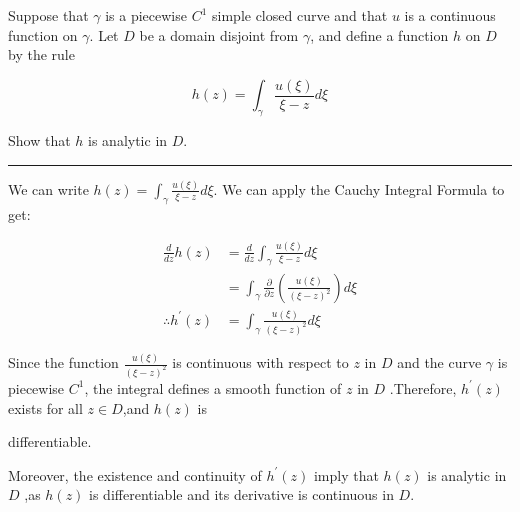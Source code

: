 \begin{example}

    Suppose that $\gamma$ is a piecewise $C^{1}$ simple closed curve and that $u$ is a continuous function on $\gamma$. Let $D$ be a domain disjoint from $\gamma$,
    and define a function $h$ on $D$ by the rule

    $$h(z)=\int_\gamma\frac{u(\xi)}{\xi-z}d\xi $$

    Show that $h$ is analytic in $D.$ \\

    \hrule
    \vspace{0.5cm}

    We can write $h(z) = \int_\gamma\frac{u(\xi)}{\xi-z}d\xi$. We can apply the Cauchy Integral Formula to get:

    \begin{align*}
        \frac{d}{dz}h(z)         & = \frac{d}{dz}\int_\gamma\frac{u(\xi)}{\xi-z}d\xi                                  \\
                                 & = \int_\gamma\frac{\partial}{\partial z}\left(\frac{u(\xi)}{(\xi-z)^2}\right) d\xi \\
        \therefore h^{\prime}(z) & = \int_\gamma\frac{u(\xi)}{(\xi-z)^2} d\xi
    \end{align*}

    Since the function $\frac{u(\xi)}{(\xi-z)^2}$ is continuous with respect to $z$ in $D$ and the curve $\gamma$ is piecewise $C^1$, the
    integral defines a smooth function of $z$ in $D$ .Therefore, $h^{\prime}(z)$ exists for all $z\in D$,and $h(z)$ is

    differentiable.

    Moreover, the existence and continuity of $h^{\prime}(z)$ imply that $h(z)$ is analytic in $D$ ,as $h(z)$ is
    differentiable and its derivative is continuous in $D.$
\end{example}